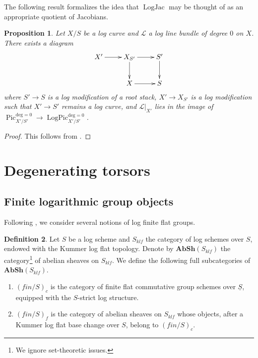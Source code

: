 \documentclass[a4paper,11pt]{amsart} %
\numberwithin{equation}{subsection}
\newcommand{\ca}[1]{{\mathcal{#1}}}
\newcommand{\bd}[1]{{\mathbf{#1}}}
\newcommand{\cat}[1]{\bd{#1}}
\def\Logjac{\operatorname{LogJac}}
\theoremstyle{definition}
\newtheorem{definition}{Definition}[section]
\theoremstyle{plain}%
\newtheorem{proposition}[definition]{Proposition}
\theoremstyle{remark}
\begin{document}
The following result formalizes the idea that $\Logjac$ may be thought of as an appropriate quotient of Jacobians.

\begin{proposition}\label{Pic and LogPic}
    Let $X/S$ be a log curve and $\ca L$ a log line bundle of degree $0$ on $X$. There exists a diagram
    \[
    \xymatrix{
    X' \ar[r] & X_{S'} \ar[r]\ar[d] & S' \ar[d] \\
    & X \ar[r] & S \\
    }
    \]
    where $S' \to S$ is a log modification of a root stack, $X' \to X_{S'}$ is a log modification such that $X' \to S'$ remains a log curve, and $\ca L|_{X'}$ lies in the image of $\operatorname{Pic}^{\mathrm{deg}=0}_{X'/S'} \to \operatorname{LogPic}^{\mathrm{deg}=0}_{X'/S'}$.
\end{proposition}

\begin{proof}
    This follows from \cite[Proposition 4.3.2]{molcho_wise_2022}.
\end{proof}



\section{Degenerating torsors}

\subsection{Finite logarithmic group objects}


Following \cite{katoJuin}, we consider several notions of log finite flat groups.

\begin{definition}
    Let $S$ be a log scheme and $S_{klf}$ the category of log schemes over $S$, endowed with the Kummer log flat topology. Denote by $\cat{AbSh}(S_{klf})$ the category\footnote{We ignore set-theoretic issues.} of abelian sheaves on $S_{klf}$. We define the following full subcategories of $\cat{AbSh}(S_{klf})$.
    \begin{enumerate}
        \item $(fin/S)_c$ is the category of finite flat commutative group schemes over $\underline{S}$, equipped with the $S$-strict log structure.
        \item $(fin/S)_f$ is the category of abelian sheaves on $S_{klf}$ whose objects, after a Kummer log flat base change over $S$, belong to $(fin/S)_c$.
    \end{enumerate}
\end{definition}
\end{document}
